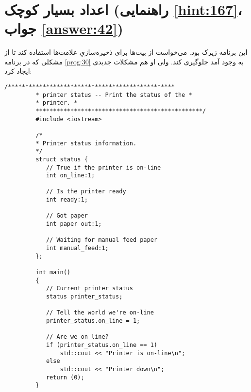 \section[اعداد بسیار کوچک]{اعداد بسیار کوچک \protect{} (راهنمایی \ref{hint:167}، جواب \ref{answer:42})}
\paragraph{}\label{prog:31}
این برنامه زیرک بود. می‌خواست از بیت‌ها برای ذخیره‌سازیِ علامت‌ها استفاده کند تا از مشکلی که در برنامه \ref{prog:30} به وجود آمد جلوگیری کند. ولی او هم مشکلات جدیدی ایجاد کرد:

\begin{LTR}
    \begin{lstlisting}[style=C++Style]
         /************************************************
         * printer status -- Print the status of the *
         * printer. *
         ************************************************/
         #include <iostream>

         /*
         * Printer status information.
         */
         struct status {
         	// True if the printer is on-line
         	int on_line:1;

         	// Is the printer ready
         	int ready:1;

         	// Got paper
         	int paper_out:1;

         	// Waiting for manual feed paper
         	int manual_feed:1;
         };

         int main()
         {
         	// Current printer status
         	status printer_status;

         	// Tell the world we're on-line
         	printer_status.on_line = 1;

         	// Are we on-line?
         	if (printer_status.on_line == 1)
         		std::cout << "Printer is on-line\n";
         	else
         		std::cout << "Printer down\n";
         	return (0);
         }
    \end{lstlisting}
\end{LTR}